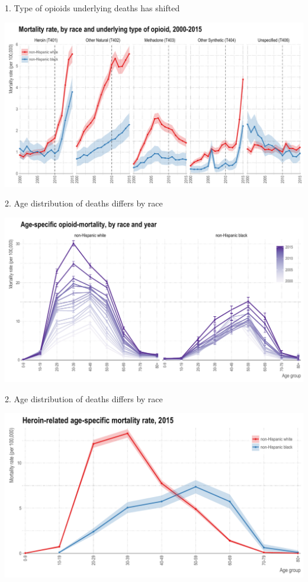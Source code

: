 \documentclass[ignorenonframetext,]{beamer}
\begin{document}
\begin{frame}{1. Type of opioids underlying deaths has shifted}

\centering
\includegraphics[width=1.0\textwidth]{./plots/fig4_t40_adjusted_race_lines_v_ci.pdf}

\end{frame}

\begin{frame}{2. Age distribution of deaths differs by race}

\centering
\includegraphics[width=1.0\textwidth]{./plots/fig5_asmr_race_all_errorbars.pdf}

\end{frame}

\begin{frame}{2. Age distribution of deaths differs by race}

\centering
\includegraphics[width=1.0\textwidth]{./plots/fig7_heroin_2015_ci.pdf}

\end{frame}
\end{document}
